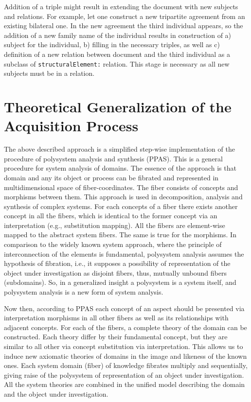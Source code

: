 \documentclass[conference]{IEEEtran}
\begin{document}
Addition of a triple might result in extending the document with new
subjects and relations.  For example, let one construct a new tripartite
agreement from an existing bilateral one.  In the new agreement the
third individual appears, so the addition of a new family name of the
individual results in construction of a) subject for the individual,
b) filling in the necessary triples, as well as c) definition of a new
relation between document and the third individual as a subclass of
\texttt{structuralElement:} relation.  This stage is necessary as all
new subjects must be in a relation.

\section{Theoretical Generalization of the Acquisition Process}

The above described approach is a simplified step-wise implementation
of the procedure of polysystem analysis and synthesis \cite{father}
(PPAS).  This is a general procedure for system analysis of domains.
The essence of the approach is that domain and any its object or
process can be fibrated and represented in multidimensional space of
fiber-coordinates.  The fiber consists of concepts and morphisms
between them.  This approach is used in decomposition, analysis and
synthesis of complex systems.  For each concepts of a fiber there
exists another concept in all the fibers, which is identical to the
former concept via an interpretation (e.g., substitution mapping).
All the fibers are element-wise mapped to the abstract system fibers.
The same is true for the morphisms.  In comparison to the widely known
system approach, where the principle of interconnection of the
elements is fundamental, polysystem analysis assumes the hypothesis of
fibration, i.e., it supposes a possibility of representation of the
object under investigation as disjoint fibers, thus, mutually unbound
fibers (subdomains).  So, in a generalized insight a polysystem is a
system itself, and polysystem analysis is a new form of system
analysis.

Now then, according to PPAS \cite{father} each concept of an aspect
should be presented via interpretation morphisms in all other fibers
as well as its relationships with adjacent concepts.  For each of the
fibers, a complete theory of the domain can be constructed.  Each
theory differ by their fundamental concept, but they are similar to
all other via concept substitution via interpretation.  This allows us
to induce new axiomatic theories of domains in the image and likeness
of the known ones.  Each system domain (fiber) of knowledge fibrates
multiply and sequentially, giving raise of the polysystem of
representation of an object under investigation.  All the system
theories are combined in the unified model describing the domain and
the object under investigation.
\end{document}
